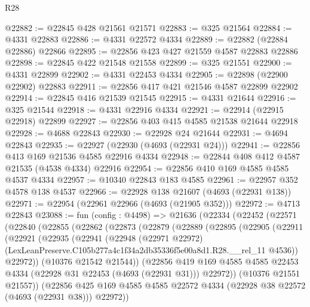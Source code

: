 \begin{lexlean}{R28}
\begin{coremodule}
@22882 := @22845 @428 @21561 @21571
@22883 := @325 @21564
@22884 := @4331 @22883
@22886 := @4331 @22572 @4334
@22889 := @22882 (@22884 @22886) @22866
@22895 := @22856 @423 @427 @21559 @4587 @22883 @22886
@22898 := @22845 @422 @21548 @21558
@22899 := @325 @21551
@22900 := @4331 @22899
@22902 := @4331 @22453 @4334
@22905 := @22898 (@22900 @22902) @22883
@22911 := @22856 @417 @421 @21546 @4587 @22899 @22902
@22914 := @22845 @416 @21539 @21545
@22915 := @4331 @21644
@22916 := @325 @21544
@22918 := @4331 @22916 @4334
@22921 := @22914 (@22915 @22918) @22899
@22927 := @22856 @403 @415 @4585 @21538 @21644 @22918
@22928 := @4688 @22843
@22930 := @22928 @24 @21644
@22931 := @4694 @22843
@22935 := @22927 (@22930 (@4693 (@22931 @24)))
@22941 := @22856 @413 @169 @21536 @4585 @22916 @4334
@22948 := @22844 @408 @412 @4587 @21535 (@4538 @4334) @22916
@22954 := @22856 @410 @169 @4585 @4585 @4537 @4334
@22957 := @10340 @22843 @183 @4585
@22961 := @22957 @352 @4578 @138 @4537
@22966 := @22928 @138 @21607 (@4693 (@22931 @138))
@22971 := @22954 (@22961 @22966 (@4693 (@21905 @352)))
@22972 := @4713 @22843
@23088 := fun (config : @4498) =>
  @21636
    (@22334
      (@22452
        (@22571
          (@22840
            (@22855
              (@22862
                (@22873
                  (@22879
                    (@22889
                      (@22895
                        (@22905
                          (@22911
                            (@22921
                              (@22935
                                (@22941
                                  (@22948
                                    (@22971 @22972)
                                    (LexLeanPreserve.C105b277a4c1f34a2db35336f5e00a8d1.R28.__rel_11
                                      @4536))
                                  @22972))
                              (@10376 @21542 @21544))
                            (@22856
                              @419
                              @169
                              @4585
                              @4585
                              @22453
                              @4334
                              (@22928 @31 @22453 (@4693 (@22931 @31)))
                              @22972))
                          (@10376 @21551 @21557))
                        (@22856
                          @425
                          @169
                          @4585
                          @4585
                          @22572
                          @4334
                          (@22928 @38 @22572 (@4693 (@22931 @38)))
                          @22972))

\end{coremodule}
\end{lexlean}
